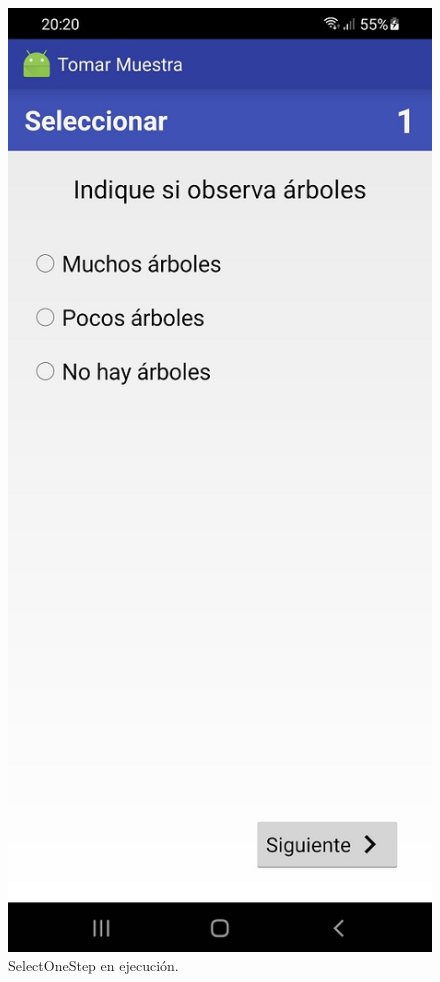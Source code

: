 \begin{figure}[H]
  \centering
    \includegraphics[scale=0.3]{50-anexos/C-steps/select_one_screen.jpg} 
    \caption{SelectOneStep en ejecución.}
\end{figure}


